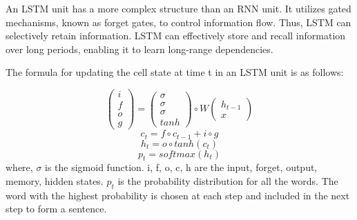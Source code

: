 \documentclass[conference]{IEEEtran}
\begin{document}
An LSTM unit has a more complex structure than an RNN unit. It utilizes gated mechanisms, known as forget gates, to control information flow. Thus, LSTM can selectively retain information. LSTM can effectively store and recall information over long periods, enabling it to learn long-range dependencies.


The formula for updating the cell state at time t in an LSTM unit is as follows:

$$
\begin{pmatrix}
i \\f \\o \\g
\end{pmatrix}
= 
\begin{pmatrix}
\sigma \\ \sigma \\ \sigma \\ tanh
\end{pmatrix}
\circ
W
\begin{pmatrix}
h_{t-1} \\
x
\end{pmatrix}
$$
$$
c_t = f\circ c_{t-1} + i\circ g
$$
$$
h_t = o \circ tanh(c_t)
$$
$$
p_t = softmax(h_t)
$$
where, $\sigma$ is the sigmoid function. i, f, o, c, h are the input, forget, output, memory, hidden states. $p_t$ is the probability distribution for all the words. The word with the highest probability is chosen at each step and included in the next step to form a sentence.







\end{document}
